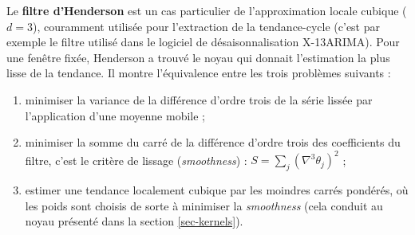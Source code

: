 \documentclass[
  12pt,
  a4paper,french]{article}
\providecommand{\tightlist}{%
  \setlength{\itemsep}{0pt}\setlength{\parskip}{0pt}}
\newcommand\1{\mathds{1}}
\begin{document}
Le \textbf{filtre d'Henderson} est un cas particulier de l'approximation locale cubique (\(d=3\)), couramment utilisée pour l'extraction de la tendance-cycle (c'est par exemple le filtre utilisé dans le logiciel de désaisonnalisation X-13ARIMA).
Pour une fenêtre fixée, Henderson a trouvé le noyau qui donnait l'estimation la plus lisse de la tendance.
Il montre l'équivalence entre les trois problèmes suivants :

\begin{enumerate}
\def\labelenumi{\arabic{enumi}.}
\tightlist
\item
  minimiser la variance de la différence d'ordre trois de la série lissée par l'application d'une moyenne mobile ;\\
\item
  minimiser la somme du carré de la différence d'ordre trois des coefficients du filtre, c'est le critère de lissage (\emph{smoothness}) : \(S=\sum_j(\nabla^{3}\theta_{j})^{2}\) ;\\
\item
  estimer une tendance localement cubique par les moindres carrés pondérés, où les poids sont choisis de sorte à minimiser la \emph{smoothness} (cela conduit au noyau présenté dans la section \ref{sec-kernels}).
\end{enumerate}

\newpage

\printbibliography[heading=bibintoc]
\end{document}
